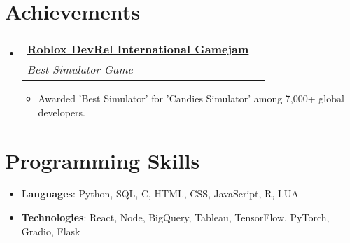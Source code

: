 \documentclass[letterpaper,11pt]{article}
\makeatletter
\newcommand{\resumeSubheading}[4]{
  \vspace{-1pt}\item
    \begin{tabular*}{0.97\textwidth}{l@{\extracolsep{\fill}}r}
      \textbf{#1} & #2 \\
      \textit{\small #3} & \textit{\small #4} \\
    \end{tabular*}\vspace{-5pt}  %
}
\newcommand{\resumeSubHeadingListStart}{\begin{itemize}[leftmargin=*]}
\newcommand{\resumeSubHeadingListEnd}{\end{itemize}}
\makeatother
\begin{document}
\section*{Achievements}
\resumeSubHeadingListStart
  \resumeSubheading
    {\href{https://media.licdn.com/dms/image/v2/D562DAQG7PINx-24MPA/profile-treasury-image-shrink_800_800/profile-treasury-image-shrink_800_800/0/1723232806730?e=1741608000\&v=beta\&t=UIry8g7Tyj4Lo9cnannvYgDn-ZYgYkDLdvKInLc7XVU}{Roblox DevRel International Gamejam}}{}
    {Best Simulator Game}{}
    \begin{itemize}
      \item Awarded 'Best Simulator' for 'Candies Simulator' among 7,000+ global developers.
    \end{itemize}
\resumeSubHeadingListEnd

\section*{Programming Skills}
\resumeSubHeadingListStart
  \item{
    \textbf{Languages}{: Python, SQL, C, HTML, CSS, JavaScript, R, LUA}
  }
  \item{
    \textbf{Technologies}{: React, Node, BigQuery, Tableau, TensorFlow, PyTorch, Gradio, Flask}
  }
\resumeSubHeadingListEnd
\end{document}
